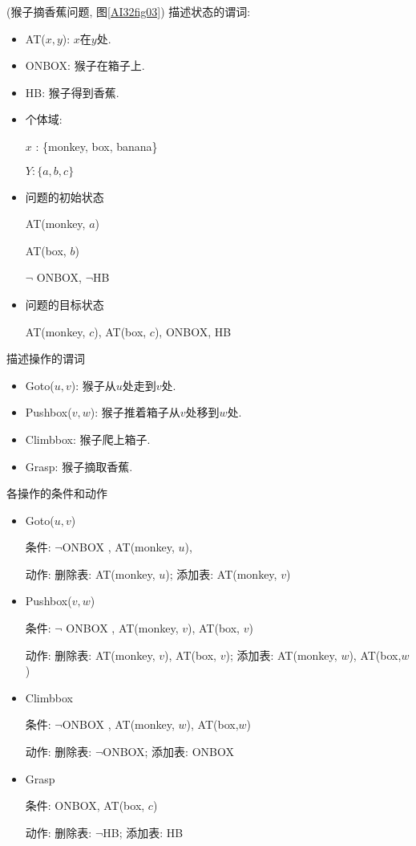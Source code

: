 \begin{example}(猴子摘香蕉问题, 图\ref{AI32fig03})
描述状态的谓词:
\begin{itemize}
\item AT($x, y$): $x$在$y$处.
\item ONBOX: 猴子在箱子上.
\item HB: 猴子得到香蕉.
\end{itemize}

\begin{itemize}
\item 个体域:

     $x$ : \{monkey, box, banana\}

     $Y: \{a, b, c\}$

\item 问题的初始状态

      AT(monkey, $a$)

      AT(box, $b$)

     $\neg$ ONBOX, $\neg$HB

\item 问题的目标状态

     AT(monkey, $c$), AT(box, $c$), ONBOX, HB
\end{itemize}
描述操作的谓词
\begin{itemize}
\item Goto($u, v$): 猴子从$u$处走到$v$处.
\item Pushbox($v, w$): 猴子推着箱子从$v$处移到$w$处.
\item Climbbox: 猴子爬上箱子.
\item Grasp: 猴子摘取香蕉.
\end{itemize}

各操作的条件和动作
\begin{itemize}
\item Goto($u, v$)

         条件: $\neg$ONBOX , AT(monkey, $u$),

         动作: 删除表: AT(monkey, $u$); 添加表: AT(monkey, $v$)
\item Pushbox($v, w$)

         条件:  $\neg$ ONBOX , AT(monkey, $v$), AT(box, $v$)

         动作: 删除表: AT(monkey, $v$), AT(box, $v$); 添加表: AT(monkey, $w$), AT(box,$w$)


\item Climbbox

          条件:  $\neg$ONBOX , AT(monkey, $w$), AT(box,$w$)

          动作: 删除表:  $\neg$ONBOX; 添加表: ONBOX
\item Grasp

         条件: ONBOX, AT(box, $c$)

         动作: 删除表:  $\neg$HB; 添加表: HB
\end{itemize}
\end{example}


